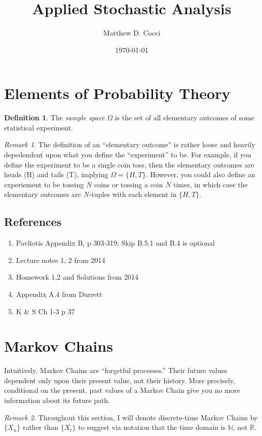 \documentclass[12pt]{article}
\author{Matthew D. Cocci}
\title{Applied Stochastic Analysis}
\date{\today}
\theoremstyle{plain}
\theoremstyle{definition}
\newtheorem{defn}[thm]{Definition}
\theoremstyle{remark}
\newtheorem*{rmk}{Remark}
\begin{document}
\maketitle

\tableofcontents

\clearpage
\section{Elements of Probability Theory}

\begin{defn}
The \emph{sample space} $\Omega$ is the set of all elementary outcomes
of some statistical experiment.
\end{defn}
\begin{rmk}
The definition of an ``elementary outcome'' is rather loose and heavily
depedendent upon what you define the ``experiment'' to be. For example,
if you define the experiment to be a single coin toss, then the
elementary outcomes are heads (H) and tails (T), implying $\Omega =
\{H,T\}$. However, you could also define an experiement to be tossing
$N$ coins or tossing a coin $N$ times, in which case the elementary
outcomes are $N$-tuples with each element in $\{H,T\}$.
\end{rmk}

\subsection{References}
\begin{enumerate}
  \item Pavliotis Appendix B, p 303-319; Skip B.5.1 and B.4 is optional
  \item Lecture notes 1, 2 from 2014
  \item Homework 1,2 and Solutions from 2014
  \item Appendix A.4 from Durrett
  \item K \& S Ch 1-3 p 37
\end{enumerate}

\clearpage
\section{Markov Chains}

Intuitively, Markov Chains are ``forgetful processes.'' Their future
values dependent only upon their present value, not their history. More
precisely, conditional on the present, past values of a Markov Chain
give you no more information about its future path.
\begin{rmk}
  Throughout this section, I will denote discrete-time Markov Chains by
  $\{X_n\}$ rather than $\{X_t\}$ to suggest via notation that the time
  domain is $\mathbb{N}$,
not $\mathbb{R}$.
\end{rmk}
\end{document}
